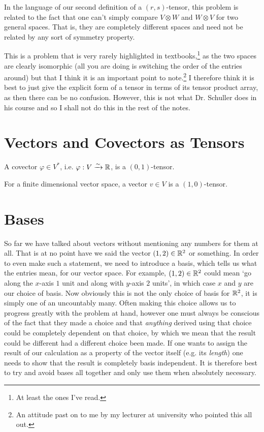     In the language of our second definition of a $(r,s)$-tensor, this problem is related to the fact that one can't simply compare $V\otimes W$ and $W\otimes V$ for two general spaces. That is, they are completely different spaces and need not be related by any sort of symmetry property. 
    
    This is a problem that is very rarely highlighted in textbooks,\footnote{At least the ones I've read.} as the two spaces are clearly isomorphic (all you are doing is switching the order of the entries around) but that I think it is an important point to note.\footnote{An attitude past on to me by my lecturer at university who pointed this all out.} I therefore think it is best to just give the explicit form of a tensor in terms of its tensor product array, as then there can be no confusion. However, this is not what Dr. Schuller does in his course and so I shall not do this in the rest of the notes. 
\er 

\section{Vectors and Covectors as Tensors}

\bc 
    A covector $\varphi\in V^*$, i.e. $\varphi:V \xrightarrow{\sim} \mathbb{R}$, is a $(0,1)$-tensor. 
\ec 

\bc 
    For a finite dimensional vector space, a vector $v\in V $ is a $(1,0)$-tensor.
\ec 

\section{Bases}

So far we have talked about vectors without mentioning any numbers for them at all. That is at no point have we said the vector $(1,2)\in\mathbb{R}^2$ or something. In order to even make such a statement, we need to introduce a basis, which tells us what the entries mean, for our vector space. For example, $(1,2)\in\mathbb{R}^2$ could mean `go along the $x$-axis $1$ unit and along with $y$-axis $2$ units', in which case $x$ and $y$ are our choice of basis. Now obviously this is not the only choice of basis for $\mathbb{R}^2$, it is simply one of an uncountably many. Often making this choice allows us to progress greatly with the problem at hand, however one must always be conscious of the fact that they made a choice and that \textit{anything} derived using that choice could be completely dependent on that choice, by which we mean that the result could be different had a different choice been made. If one wants to assign the result of our calculation as a property of the vector itself (e.g. its \textit{length}) one needs to show that the result is completely basis independent. It is therefore best to try and avoid bases all together and only use them when absolutely necessary. 

